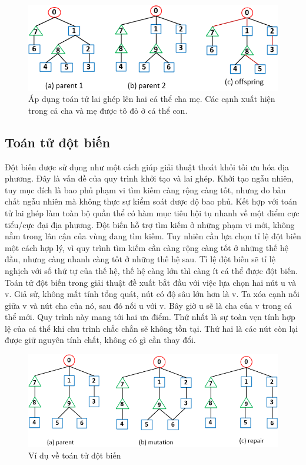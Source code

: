 \documentclass{hust}
\begin{document}
\begin{figure}[H]
	\includegraphics[scale=1.0]{images/crossover.png}
	\caption{Áp dụng toán tử lai ghép lên hai cá thể cha mẹ. Các cạnh xuất hiện trong cả cha và mẹ được tô đỏ ở cá thể con.} \label{fig:cross}
\end{figure}

\subsection{Toán tử đột biến} \label{mutation}

Đột biến được sử dụng như một cách giúp giải thuật thoát khỏi tối ưu hóa địa phương. Đây là vấn đề của quy trình khởi tạo và lai ghép. Khởi tạo ngẫu nhiên, tuy mục đích là bao phủ phạm vi tìm kiếm càng rộng càng tốt, nhưng do bản chất ngẫu nhiên mà không thực sự kiểm soát được độ bao phủ. Kết hợp với toán tử lai ghép làm toàn bộ quần thể có hàm mục tiêu hội tụ nhanh về một điểm cực tiểu/cực đại địa phương.
Đột biến hỗ trợ tìm kiếm ở những phạm vi mới, không nằm trong lân cận của vùng đang tìm kiếm. Tuy nhiên cần lựa chọn tỉ lệ đột biến một cách hợp lý, vì quy trình tìm kiếm cần càng rộng càng tốt ở những thế hệ đầu, nhưng càng nhanh càng tốt ở những thế hệ sau. Tỉ lệ đột biến sẽ tỉ lệ nghịch với số thứ tự của thế hệ, thế hệ càng lớn thì càng ít cá thể được đột biến.
Toán tử đột biến trong giải thuật đề xuất bắt đầu với việc lựa chọn hai nút u và v. Giả sử, không mất tính tổng quát, nút có độ sâu lớn hơn là v. Ta xóa cạnh nối giữa v và nút cha của nó, sau đó nối u với v. Bây giờ u sẽ là cha của v trong cá thể mới. Quy trình này mang tới hai ưa điểm. Thứ nhất là sự toàn vẹn tính hợp lệ của cá thể khi chu trình chắc chắn sẽ không tồn tại. Thứ hai là các nút còn lại được giữ nguyên tính chất, không có gì cần thay đổi.

\begin{figure}[H]
	\centering
	\includegraphics[scale=1.0]{images/mutation}
	\caption{Ví dụ về toán tử đột biến}\label{fig:mutation}
\end{figure}
\end{document}
